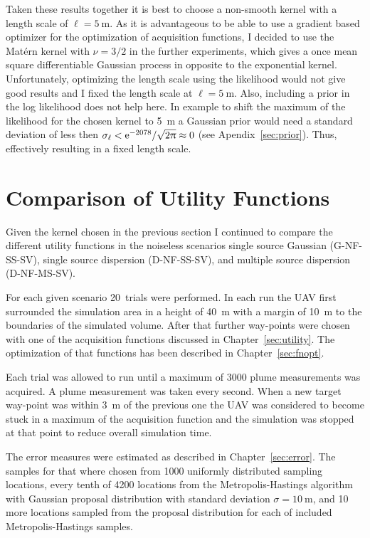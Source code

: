 Taken these results together it is best to choose a non-smooth kernel with 
a length scale of $\ell = \SI{5}{\meter}$. As it is advantageous to be able to 
use a gradient based optimizer for the optimization of acquisition functions, 
I decided to use the Matérn kernel with $\nu = 3/2$ in the further experiments, 
which gives a once mean square differentiable Gaussian process in opposite to 
the exponential kernel. Unfortunately, optimizing the length scale using the 
likelihood would not give good results and I fixed the length scale at $\ell 
= \SI{5}{\meter}$. Also, including a prior in the log likelihood does not help 
here. In example to shift the maximum of the likelihood for the chosen kernel to 
\SI{5}{\meter} a Gaussian prior would need a standard deviation of less then 
$\sigma_{\ell} < \mathrm{e}^{-2078} / \sqrt{2\uppi} \approx 0$ (see 
Apendix~\ref{sec:prior}).  Thus, effectively resulting in a fixed length scale.

\section{Comparison of Utility Functions}\label{sec:cmputility}
Given the kernel chosen in the previous section I continued to compare the 
different utility functions in the noiseless scenarios single source Gaussian 
(G-NF-SS-SV), single source dispersion (D-NF-SS-SV), and multiple source 
dispersion (D-NF-MS-SV).

For each given scenario 20~trials were performed. In each run the UAV first 
surrounded the simulation area in a height of \SI{40}{\meter} with a margin of 
\SI{10}{\meter} to the boundaries of the simulated volume. After that further 
way-points were chosen with one of the acquisition functions discussed in 
Chapter~\ref{sec:utility}. The optimization of that functions has been described 
in Chapter~\ref{sec:fnopt}.

Each trial was allowed to run until a maximum of \num{3000} plume measurements 
was acquired. A plume measurement was taken every second. When a new target 
way-point was within \SI{3}{\meter} of the previous one the UAV was considered 
to become stuck in a maximum of the acquisition function and the simulation was 
stopped at that point to reduce overall simulation time.

The error measures were estimated as described in Chapter~\ref{sec:error}. The 
samples for that where chosen from 1000 uniformly distributed sampling 
locations, every tenth of 4200 locations from the Metropolis-Hastings algorithm 
with Gaussian proposal distribution with standard deviation $\sigma 
= \SI{10}{\meter}$, and 10 more locations sampled from the proposal distribution 
for each of included Metropolis-Hastings samples.

